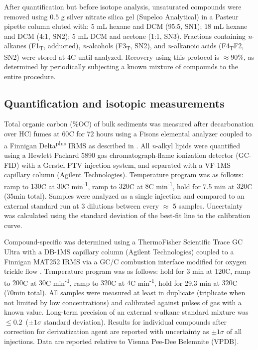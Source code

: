 After quantification but before isotope analysis, unsaturated compounds were removed using $0.5$ g silver nitrate silica gel (Supelco Analytical) in a Pasteur pipette column eluted with: $5$ mL hexane and DCM (95:5, SN1); $18$ mL hexane and DCM (4:1, SN2); $5$ mL DCM and acetone (1:1, SN3). Fractions containing \textit{n}-alkanes (F1\textsubscript{T}, adducted), \textit{n}-alcohols (F3\textsubscript{T}, SN2), and \textit{n}-alkanoic acids (F4\textsubscript{T}F2, SN2) were stored at $4$\textdegree C until analyzed. Recovery using this protocol is $\approx 90$\%, as determined by periodically subjecting a known mixture of compounds to the entire procedure.

\subsection{Quantification and isotopic measurements}

Total organic carbon (\%OC) of bulk sediments was measured after decarbonation over HCl fumes at $60$\textdegree C for 72 hours using a Fisons elemental analyzer coupled to a Finnigan Delta\textsuperscript{plus} IRMS as described in \citet{Whiteside:2011jea}. All \textit{n}-alkyl lipids were quantified using a Hewlett Packard 5890 gas chromatograph-flame ionization detector (GC-FID) with a Gerstel PTV injection system, and separated with a VF-1MS capillary column (Agilent Technologies). Temperature program was as follows: ramp to $130$\textdegree C at $30$\textdegree C min\textsuperscript{-1}, ramp to $320$\textdegree C at $8$\textdegree C min\textsuperscript{-1}, hold for 7.5 min at $320$\textdegree C (35min total). Samples were analyzed as a single injection and compared to an external standard run at 3 dilutions between every $\approx$ 5 samples. Uncertainty was calculated using the standard deviation of the best-fit line to the calibration curve.

Compound-specific  was determined using a ThermoFisher Scientific Trace GC Ultra with a DB-1MS capillary column (Agilent Technologies) coupled to a Finnigan MAT252 IRMS via a GC/C combustion interface modified for oxygen trickle flow \citep{Merritt:1995vt,Sessions:2006bn}. Temperature program was as follows: hold for 3 min at $120$\textdegree C, ramp to $200$\textdegree C at $30$\textdegree C min\textsuperscript{-1}, ramp to $320$\textdegree C at $4$\textdegree C min\textsuperscript{-1}, hold for 29.3 min at $320$\textdegree C (70min total). All samples were measured at least in duplicate (triplicate when not limited by low concentrations) and calibrated against pulses of  gas with a known  value. Long-term precision of an external \textit{n}-alkane standard mixture was $\leq 0.2$\textperthousand\ ($\pm 1\sigma$ standard deviation). Results for individual compounds after correction for derivatization agent are reported with uncertainty as $\pm 1\sigma$ of all injections. Data are reported relative to Vienna Pee-Dee Belemnite (VPDB).

